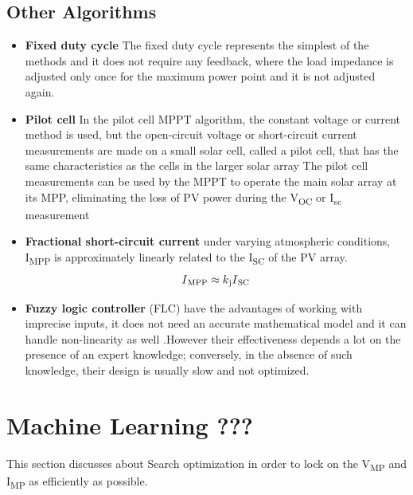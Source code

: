 {\subsection{Other Algorithms}
  \begin{itemize}
  \item {\bf Fixed duty cycle} The fixed duty cycle represents the simplest of the methods and it does not require any feedback, where the load impedance is adjusted only once for the maximum power point and it is not adjusted again.
  \item {\bf Pilot cell} In the pilot cell MPPT algorithm, the constant voltage or current method is used, but the open-circuit voltage or short-circuit current measurements are made on a small solar cell, called a pilot cell, that has the same characteristics as the cells in the larger solar array The pilot cell measurements can be used by the MPPT to operate the main solar array at its MPP, eliminating the loss of PV power during the V\textsubscript{OC} or I\textsubscript{sc} measurement
  \item {\bf Fractional short-circuit current }  under varying atmospheric conditions, I\textsubscript{MPP} is approximately linearly related to the I\textsubscript{SC} of the PV array. \newline
    \begin{equation}
      \begin{aligned}
    I\textsubscript{MPP} \approx k\textsubscript{j}I\textsubscript{SC}
    \label{eq:equ_fracoc}
    \end{aligned}
    \end{equation}
   \item {\bf Fuzzy logic controller} (FLC) have the advantages of working with imprecise inputs, it does not need an accurate mathematical model and it can handle non-linearity as well \cite{messai2011maximu}.However their effectiveness depends a lot on the presence of an expert knowledge; conversely, in the absence of such knowledge, their design is usually slow and not optimized. 
  \end{itemize} 
  







\section{Machine Learning ???}
This section discusses about Search optimization in order to lock on the  V\textsubscript{MP} and I\textsubscript{MP} as efficiently as possible.

}
